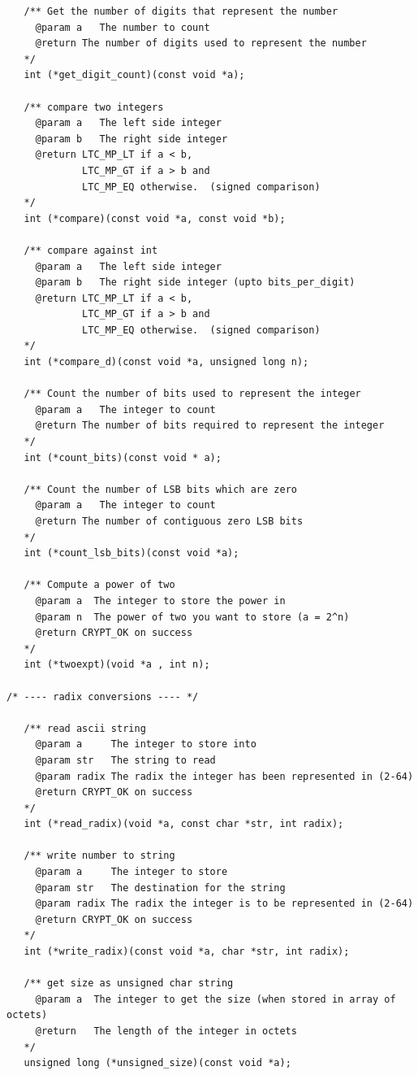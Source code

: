 \documentclass[synpaper]{book}
\begin{document}
\begin{small}
\begin{verbatim}
   /** Get the number of digits that represent the number
     @param a   The number to count
     @return The number of digits used to represent the number
   */
   int (*get_digit_count)(const void *a);

   /** compare two integers
     @param a   The left side integer
     @param b   The right side integer
     @return LTC_MP_LT if a < b,
             LTC_MP_GT if a > b and
             LTC_MP_EQ otherwise.  (signed comparison)
   */
   int (*compare)(const void *a, const void *b);

   /** compare against int
     @param a   The left side integer
     @param b   The right side integer (upto bits_per_digit)
     @return LTC_MP_LT if a < b,
             LTC_MP_GT if a > b and
             LTC_MP_EQ otherwise.  (signed comparison)
   */
   int (*compare_d)(const void *a, unsigned long n);

   /** Count the number of bits used to represent the integer
     @param a   The integer to count
     @return The number of bits required to represent the integer
   */
   int (*count_bits)(const void * a);

   /** Count the number of LSB bits which are zero
     @param a   The integer to count
     @return The number of contiguous zero LSB bits
   */
   int (*count_lsb_bits)(const void *a);

   /** Compute a power of two
     @param a  The integer to store the power in
     @param n  The power of two you want to store (a = 2^n)
     @return CRYPT_OK on success
   */
   int (*twoexpt)(void *a , int n);

/* ---- radix conversions ---- */

   /** read ascii string
     @param a     The integer to store into
     @param str   The string to read
     @param radix The radix the integer has been represented in (2-64)
     @return CRYPT_OK on success
   */
   int (*read_radix)(void *a, const char *str, int radix);

   /** write number to string
     @param a     The integer to store
     @param str   The destination for the string
     @param radix The radix the integer is to be represented in (2-64)
     @return CRYPT_OK on success
   */
   int (*write_radix)(const void *a, char *str, int radix);

   /** get size as unsigned char string
     @param a  The integer to get the size (when stored in array of octets)
     @return   The length of the integer in octets
   */
   unsigned long (*unsigned_size)(const void *a);


\end{verbatim}
\end{small}
\end{document}
